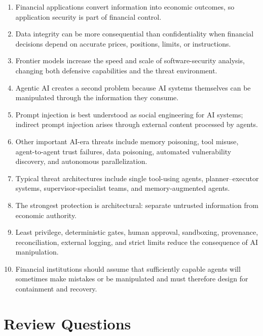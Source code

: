 \begin{enumerate}
    \item Financial applications convert information into economic outcomes, so application security is part of financial control.
    \item Data integrity can be more consequential than confidentiality when financial decisions depend on accurate prices, positions, limits, or instructions.
    \item Frontier models increase the speed and scale of software-security analysis, changing both defensive capabilities and the threat environment.
    \item Agentic AI creates a second problem because AI systems themselves can be manipulated through the information they consume.
    \item Prompt injection is best understood as social engineering for AI systems; indirect prompt injection arises through external content processed by agents.
    \item Other important AI-era threats include memory poisoning, tool misuse, agent-to-agent trust failures, data poisoning, automated vulnerability discovery, and autonomous parallelization.
    \item Typical threat architectures include single tool-using agents, planner--executor systems, supervisor-specialist teams, and memory-augmented agents.
    \item The strongest protection is architectural: separate untrusted information from economic authority.
    \item Least privilege, deterministic gates, human approval, sandboxing, provenance, reconciliation, external logging, and strict limits reduce the consequence of AI manipulation.
    \item Financial institutions should assume that sufficiently capable agents will sometimes make mistakes or be manipulated and must therefore design for containment and recovery.
\end{enumerate}

\section{Review Questions}

